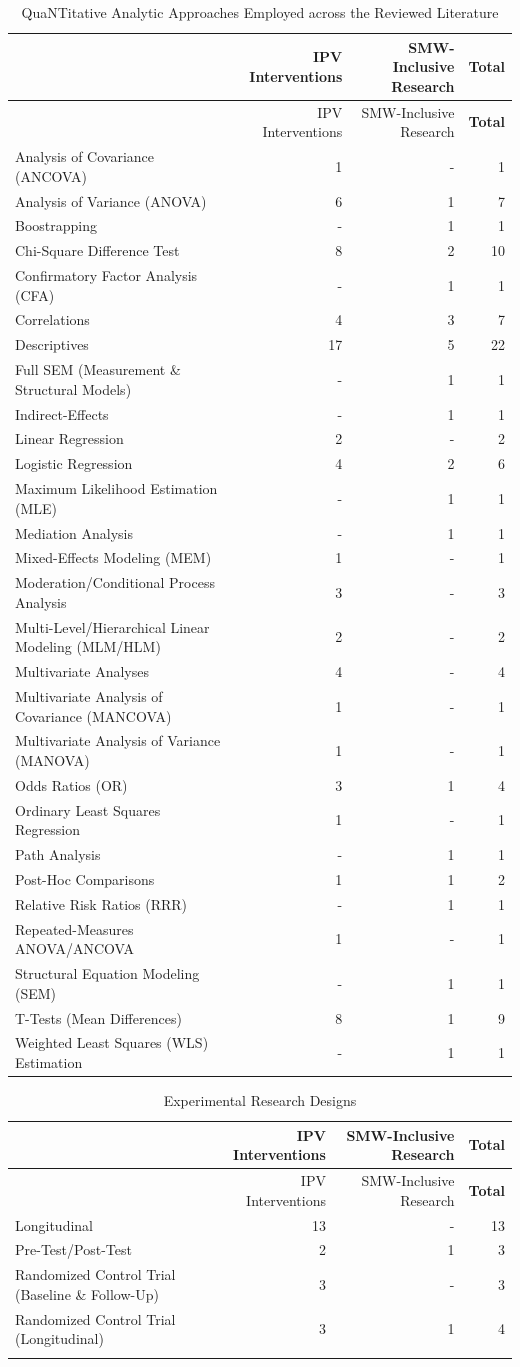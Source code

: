 \documentclass[11pt,]{tufte-book}
\begin{document}
\begin{longtable}[]{@{}lrrr@{}}
\caption{QuaNTitative Analytic Approaches Employed across the Reviewed
Literature \label{tbl:aqt}}\tabularnewline
\toprule
& IPV Interventions & SMW-Inclusive Research &
\textbf{Total}\tabularnewline
\midrule
\endfirsthead
\toprule
& IPV Interventions & SMW-Inclusive Research &
\textbf{Total}\tabularnewline
\midrule
\endhead
Analysis of Covariance (ANCOVA) & 1 & - & 1\tabularnewline
Analysis of Variance (ANOVA) & 6 & 1 & 7\tabularnewline
Boostrapping & - & 1 & 1\tabularnewline
Chi-Square Difference Test & 8 & 2 & 10\tabularnewline
Confirmatory Factor Analysis (CFA) & - & 1 & 1\tabularnewline
Correlations & 4 & 3 & 7\tabularnewline
Descriptives & 17 & 5 & 22\tabularnewline
Full SEM (Measurement \& Structural Models) & - & 1 & 1\tabularnewline
Indirect-Effects & - & 1 & 1\tabularnewline
Linear Regression & 2 & - & 2\tabularnewline
Logistic Regression & 4 & 2 & 6\tabularnewline
Maximum Likelihood Estimation (MLE) & - & 1 & 1\tabularnewline
Mediation Analysis & - & 1 & 1\tabularnewline
Mixed-Effects Modeling (MEM) & 1 & - & 1\tabularnewline
Moderation/Conditional Process Analysis & 3 & - & 3\tabularnewline
Multi-Level/Hierarchical Linear Modeling (MLM/HLM) & 2 & - &
2\tabularnewline
Multivariate Analyses & 4 & - & 4\tabularnewline
Multivariate Analysis of Covariance (MANCOVA) & 1 & - & 1\tabularnewline
Multivariate Analysis of Variance (MANOVA) & 1 & - & 1\tabularnewline
Odds Ratios (OR) & 3 & 1 & 4\tabularnewline
Ordinary Least Squares Regression & 1 & - & 1\tabularnewline
Path Analysis & - & 1 & 1\tabularnewline
Post-Hoc Comparisons & 1 & 1 & 2\tabularnewline
Relative Risk Ratios (RRR) & - & 1 & 1\tabularnewline
Repeated-Measures ANOVA/ANCOVA & 1 & - & 1\tabularnewline
Structural Equation Modeling (SEM) & - & 1 & 1\tabularnewline
T-Tests (Mean Differences) & 8 & 1 & 9\tabularnewline
Weighted Least Squares (WLS) Estimation & - & 1 & 1\tabularnewline
\bottomrule
\end{longtable}

\begin{longtable}[]{@{}lrrr@{}}
\caption{Experimental Research Designs \label{tbl:expp}}\tabularnewline
\toprule
& IPV Interventions & SMW-Inclusive Research &
\textbf{Total}\tabularnewline
\midrule
\endfirsthead
\toprule
& IPV Interventions & SMW-Inclusive Research &
\textbf{Total}\tabularnewline
\midrule
\endhead
Longitudinal & 13 & - & 13\tabularnewline
Pre-Test/Post-Test & 2 & 1 & 3\tabularnewline
Randomized Control Trial (Baseline \& Follow-Up) & 3 & - &
3\tabularnewline
Randomized Control Trial (Longitudinal) & 3 & 1 & 4\tabularnewline
\newpage & & &\tabularnewline
\bottomrule
\end{longtable}
\end{document}
